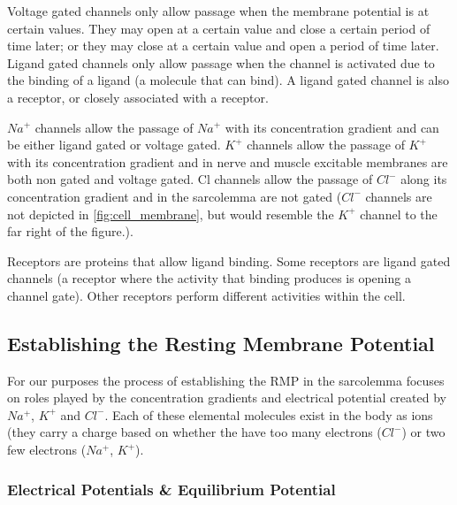 Voltage gated channels only allow passage when the membrane potential is at certain values. They may open at a certain value and close a certain period of time later; or they may close at a certain value and open a period of time later. 
Ligand gated channels only allow passage when the channel is activated due to the binding of a ligand (a molecule that can bind). A ligand gated channel is also a receptor, or closely associated with a receptor. 

$Na^+$ channels allow the passage of $Na^+$ with its concentration gradient and can be either ligand gated or voltage gated. $K^+$ channels allow the passage of $K^+$ with its concentration gradient and in nerve and muscle excitable membranes are both non gated and voltage gated. Cl channels allow the passage of $Cl^-$ along its concentration gradient and in the sarcolemma are not gated ($Cl^-$ channels are not depicted in \ref{fig:cell_membrane}, but would resemble the $K^+$ channel to the far right of the figure.).

Receptors are proteins that allow ligand binding. Some receptors are ligand gated channels (a receptor where the activity that binding produces is opening a channel gate). Other receptors perform different activities within the cell. 


\subsection{Establishing the Resting Membrane Potential}

For our purposes the process of establishing the RMP in the sarcolemma focuses on roles played by the concentration gradients and electrical potential created by $Na^+$, $K^+$ and $Cl^-$. Each of these elemental molecules exist in the body as ions (they carry a charge based on whether the have too many electrons ($Cl^-$) or two few electrons ($Na^+$, $K^+$).\footnotemark{} 

\subsubsection{Electrical Potentials \& Equilibrium Potential}

